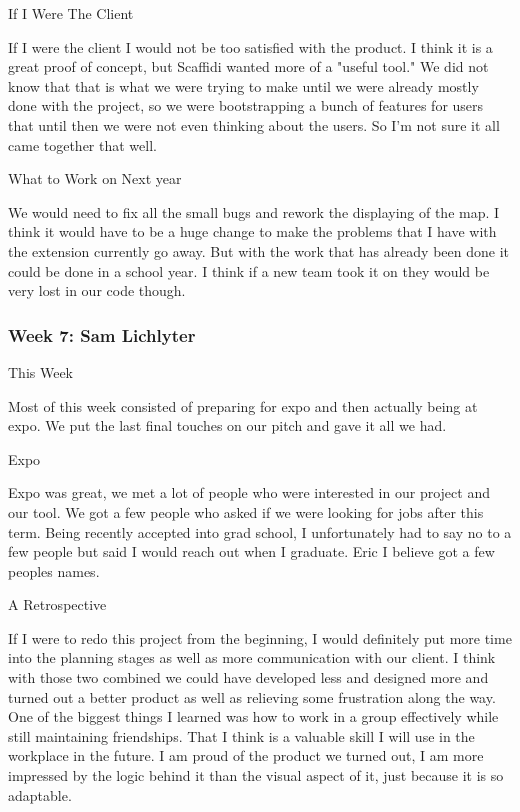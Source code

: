 If I Were The Client



If I were the client I would not be too satisfied with the product. I think it is a great proof of concept, but Scaffidi wanted more of a "useful tool." We did not know that that is what we were trying to make until we were already mostly done with the project, so we were bootstrapping a bunch of features for users that until then we were not even thinking about the users. So I'm not sure it all came together that well.



What to Work on Next year



We would need to fix all the small bugs and rework the displaying of the map. I think it would have to be a huge change to make the problems that I have with the extension currently go away. But with the work that has already been done it could be done in a school year. I think if a new team took it on they would be very lost in our code though. \\ 




 \subsubsection{Week 7: Sam Lichlyter}

This Week

Most of this week consisted of preparing for expo and then actually being at expo. We put the last final touches on our pitch and gave it all we had.



Expo

Expo was great, we met a lot of people who were interested in our project and our tool. We got a few people who asked if we were looking for jobs after this term. Being recently accepted into grad school, I unfortunately had to say no to a few people but said I would reach out when I graduate. Eric I believe got a few peoples names.



A Retrospective

If I were to redo this project from the beginning, I would definitely put more time into the planning stages as well as more communication with our client. I think with those two combined we could have developed less and designed more and turned out a better product as well as relieving some frustration along the way. One of the biggest things I learned was how to work in a group effectively while still maintaining friendships. That I think is a valuable skill I will use in the workplace in the future. I am proud of the product we turned out, I am more impressed by the logic behind it than the visual aspect of it, just because it is so adaptable.    \\ 

